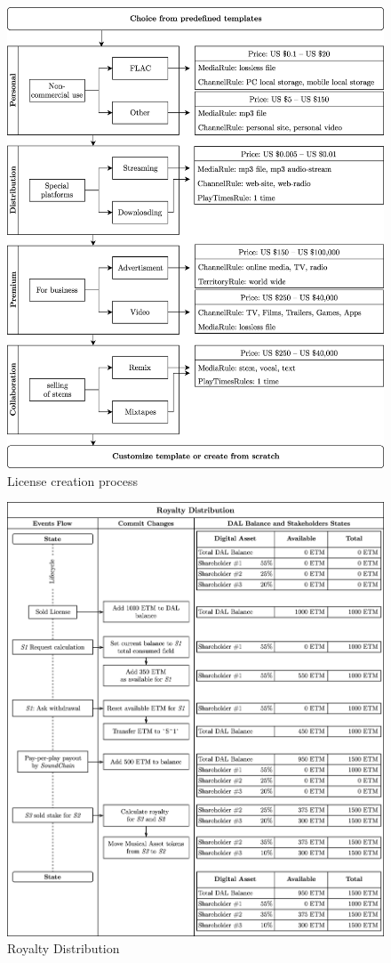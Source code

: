\documentclass[12pt]{report}
\begin{document}
\begin{figure}[H]
\centering
\caption{License creation process}
\vspace{20pt}
\includegraphics[width=\textwidth]{licensing}
\end{figure}

\begin{figure}[H]
\centering
\caption{Royalty Distribution}
\vspace{20pt}
\includegraphics[width=\textwidth]{royalty}
\end{figure}
\end{document}
